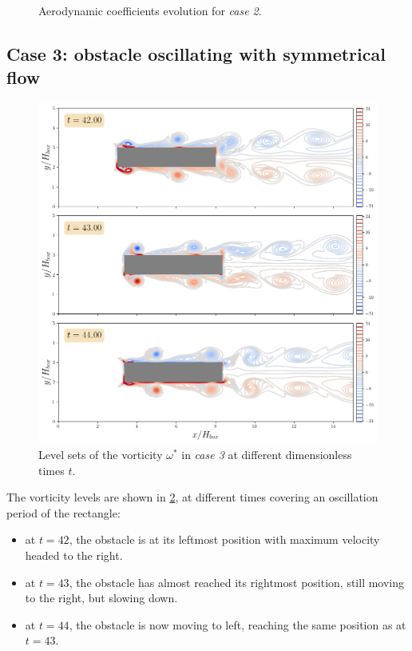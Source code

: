 \documentclass[11 pt]{article}
\begin{document}
\begin{figure}[H]
    \centering
    
    \caption{Aerodynamic coefficients evolution for \textit{case 2}.}
    \label{fig:drag_case2}
\end{figure}


\subsection{Case 3: obstacle oscillating with symmetrical flow}

\begin{figure}[H]
    \centering
    \includegraphics[width=\textwidth]{../figures/vorticity_case_3.png}
    \caption{Level sets of the vorticity $\omega^*$ in \textit{case 3} at different dimensionless times $t$.}
    \label{fig:vorticity_3}
\end{figure}

The vorticity levels are shown in \ref{fig:vorticity_3}, at different times covering an oscillation period of the rectangle:
\begin{itemize}
    \item at $t=42$, the obstacle is at its leftmost position with maximum velocity headed to the right.
    \item at $t=43$, the obstacle has almost reached its rightmost position, still moving to the right, but slowing down.
    \item at $t=44$, the obstacle is now moving to left, reaching the same position as at $t=43$.
\end{itemize}
\end{document}
